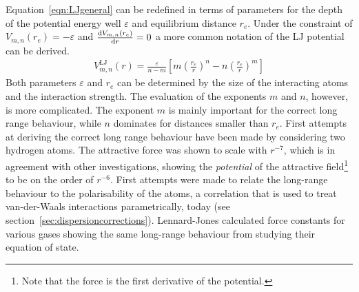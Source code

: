 Equation~\eqref{eqn:LJgeneral} can be redefined in terms of parameters for the
depth of the potential energy well $\varepsilon$ and equilibrium distance
$r_e$. Under the constraint of $V_{m,n}(r_e)=-\varepsilon$ and
$\dv{V_{m,n}(r_e)}{r}=0$ a more common notation of the \ac{LJ} potential can be
derived.
%
\begin{align}
    V_{m,n}^\text{LJ}(r)=\frac{\varepsilon}{n-m} \left[ m \left(\frac{r_e}{r}\right)^n  - n\left(\frac{r_e}{r}\right)^m \right]\label{eqn:LJgeneral_theory}
\end{align}
%
Both parameters $\varepsilon$ and $r_e$ can be determined by the size of the
interacting atoms and the interaction strength. The evaluation of the exponents
$m$ and $n$, however, is more complicated. The exponent $m$ is mainly important
for the correct long range behaviour, while $n$ dominates for distances smaller
than $r_e$. First attempts at deriving the correct long range behaviour have
been made by considering two hydrogen
atoms.\autocite{Wang_gegenseitigeEinwirkungzweier_1927} The attractive force was
shown to scale with $r^{-7}$, which is in agreement with other investigations,
showing the \textit{potential} of the attractive field\footnote{Note that the
force is the first derivative of the potential.} to be on the order of
$r^{-6}$.\autocite{Eisenschitz_UeberVerhaeltnisvan_1930,Lennard-Jones_Perturbationproblemsquantum_1930,Hasse_calculationvanWaal_1931,Slater_VanWaalsForces_1931}
First attempts were made to relate the long-range behaviour to the
polarisability of the
atoms,\autocite{London_ZurTheorieund_1930,Slater_VanWaalsForces_1931} a
correlation that is used to treat van-der-Waals interactions parametrically,
today (see section~\ref{sec:dispersioncorrections}). Lennard-Jones calculated
force constants for various gases showing the same long-range behaviour from
studying their equation of
state.\autocite{Jones_DeterminationMolecularFields_1924,Jones_atomicfieldshelium_1925,Lennard-Jones_theoreticalcalculationsphysical_1925,Lennard-Jones_molecularfieldshydrogen_1926,Lennard-Jones_equationstategaseous_1927}

